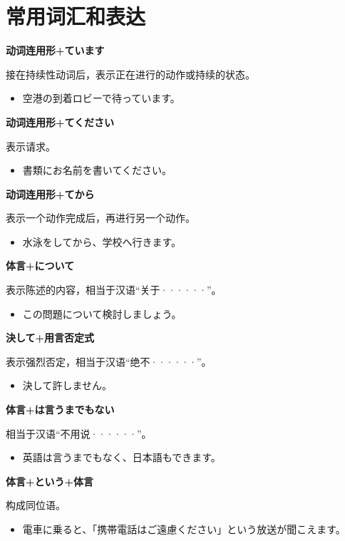 \section{常用词汇和表达}%
\label{sec:exp}

{\bf
\noindent 动词连用形+ています
}

接在持续性动词后，表示正在进行的动作或持续的状态。
\begin{itemize}
  \item 空港の到着ロビーで待っています。
\end{itemize}

{\bf
\noindent 动词连用形+てください
}

表示请求。
\begin{itemize}
  \item 書類にお名前を書いてください。
\end{itemize}

{\bf
\noindent 动词连用形+てから
}

表示一个动作完成后，再进行另一个动作。
\begin{itemize}
  \item 水泳をしてから、学校へ行きます。
\end{itemize}

{\bf
\noindent 体言+について
}

表示陈述的内容，相当于汉语``关于······''。
\begin{itemize}
  \item この問題について検討しましょう。
\end{itemize}

{\bf
\noindent 決して+用言否定式
}

表示强烈否定，相当于汉语``绝不······''。
\begin{itemize}
  \item 決して許しません。
\end{itemize}

{\bf
\noindent 体言+は言うまでもない
}

相当于汉语``不用说······''。
\begin{itemize}
  \item 英語は言うまでもなく、日本語もできます。
\end{itemize}

{\bf
\noindent 体言+という+体言
}

构成同位语。
\begin{itemize}
  \item 電車に乗ると、「携帯電話はご遠慮ください」という放送が聞こえます。
\end{itemize}

